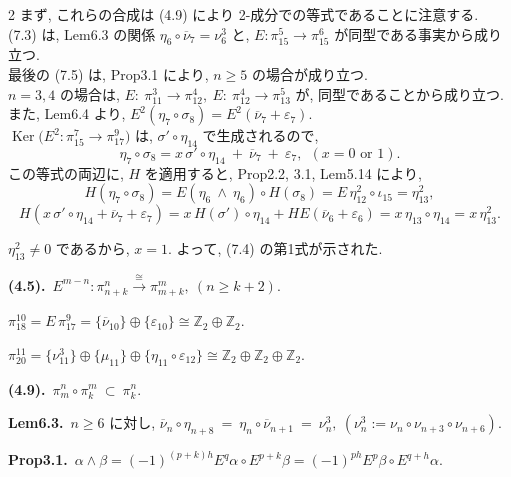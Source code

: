 \documentclass[10pt, leqno]{ltjsarticle}
\newcommand{\ov}[1]{\overline{#1}}
\newcommand{\gen}[1]{\{#1\}}       %
\newcommand{\Ker}{\operatorname{Ker}}
\newcommand{\pit}[2]{\pi_{#1}^{#2}}
\numberwithin{equation}{section}
\theoremstyle{plain}
\theoremstyle{definition}
\theoremstyle{remark}
\begin{document}
\begin{paracol}{2}
\noindent
まず, これらの合成は (4.9) により 2-成分での等式であることに注意する. \\
(7.3) は,  Lem6.3 の関係 \(\eta_{6}\circ\ov{\nu}_{7}=\nu_{6}^{3}\) と, 
\(E:\pit{15}{5}\to\pit{15}{6}\) が同型である事実から成り立つ. \\
最後の (7.5) は, Prop3.1 により, \(n\ge5\) の場合が成り立つ. \\
\(n=3,4\) の場合は,
\(
E:\ \pit{11}{3}\to\pit{12}{4},\
E:\ \pit{12}{4}\to\pit{13}{5}
\)
が, 同型であることから成り立つ. \\
また,  Lem6.4 より, 
\(E^{2}(\eta_{7}\circ\sigma_{8})=E^{2}(\ov{\nu}_{7}+\varepsilon_{7})\).\\
\(\Ker\bigl(E^{2}:\pit{15}{7}\to\pit{17}{9}\bigr)\) は,
\(\sigma'\circ\eta_{14}\) で生成されるので, 
\[
\eta_{7}\circ\sigma_{8}
= x\,\sigma'\circ\eta_{14}\ +\ \ov{\nu}_{7}\ +\ \varepsilon_{7},\
\ (x=0 \text{ or } 1).
\]
この等式の両辺に, \(H\) を適用すると,
Prop2.2, 3.1,  Lem5.14 により, 
\[
H(\eta_{7}\circ\sigma_{8})
=E(\eta_{6}\ \wedge\ \eta_{6})\circ H(\sigma_{8})
=E\,\eta_{12}^{2}\circ\iota_{15}
=\eta_{13}^{2},
\]
\[
H(x\,\sigma'\circ\eta_{14}+\ov{\nu}_{7}+\varepsilon_{7})
= x\,H(\sigma')\circ\eta_{14}+HE(\ov{\nu}_{6}+\varepsilon_{6})
= x\,\eta_{13}\circ\eta_{14}
= x\,\eta_{13}^{2}.
\]


\noindent
\(\eta_{13}^{2}\neq0\) であるから, \(x=1\). 
よって, (7.4) の第1式が示された.

\switchcolumn

\noindent
\textbf{(4.5).}\
\(E^{m-n}:\pit{n+k}{n}\xrightarrow{\cong}\pit{m+k}{m},\
(n\ge k+2). \)

\noindent
\(\pit{18}{10}=E\,\pit{17}{9}
=\gen{\ov{\nu}_{10}} \oplus \gen{\varepsilon_{10}}
\cong \mathbb Z_{2}\oplus\mathbb Z_{2}.\)

\noindent
\(\pit{20}{11}=\gen{\nu_{11}^{3}}\oplus\gen{\mu_{11}}\oplus
\gen{\eta_{11}\circ\varepsilon_{12}}
\cong\mathbb Z_{2}\oplus\mathbb Z_{2}\oplus\mathbb Z_{2} .\)

\noindent
\textbf{(4.9).}\
\(\pit{m}{n}\circ\pit{k}{m}\ \subset\ \pit{k}{n}.\)

\noindent
\textbf{Lem6.3.}\
\(n\ge6\) に対し,
\(
\overline\nu_n\circ \eta_{n+8}\ 
=\ \eta_n\circ \overline\nu_{n+1}\ =\ \nu_n^{3},
\ (\nu_n^{3}:=\nu_n\circ \nu_{n+3}\circ \nu_{n+6}).
\)

\noindent
\textbf{Prop3.1.}\
\(
\alpha \wedge \beta
= (-1)^{(p+k)h} E^{q}\alpha \circ E^{p+k}\beta
= (-1)^{ph} E^{p}\beta \circ E^{q+h}\alpha .
\)


\end{paracol}
\end{document}
